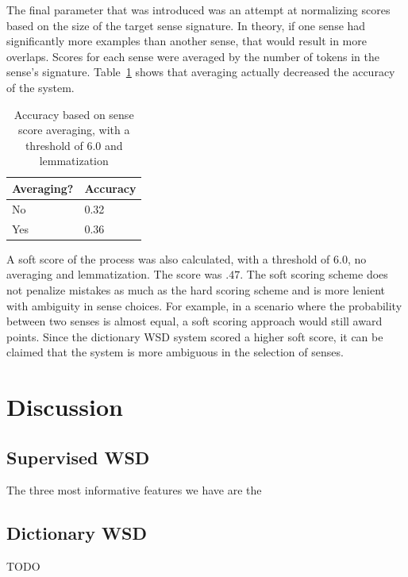 \documentclass[11pt]{article}
\begin{document}
The final parameter that was introduced was an attempt at normalizing scores based on the size of the target sense signature. In theory, if one sense had significantly more examples than another sense, that would result in more overlaps. Scores for each sense were averaged by the number of tokens in the sense's signature. Table~\ref{averaging} shows that averaging actually decreased the accuracy of the system.

\begin{table}[ht]
    \centering
    \begin{tabular}{|l|l|}
    \hline
    Averaging?                          & Accuracy   \\ \hline
    No & 0.32 \\
    Yes        & 0.36 \\ \hline
    \end{tabular}
\caption{Accuracy based on sense score averaging, with a threshold of 6.0 and lemmatization}
\label{averaging}
\end{table}

A soft score of the process was also calculated, with a threshold of 6.0, no averaging and lemmatization. The score was $.47$. The soft scoring scheme does not penalize mistakes as much as the hard scoring scheme and is more lenient with ambiguity in sense choices. For example, in a scenario where the probability between two senses is almost equal, a soft scoring approach would still award points. Since the dictionary WSD system scored a higher soft score, it can be claimed that the system is more ambiguous in the selection of senses.

\section{Discussion}
\subsection{Supervised WSD}
The three most informative features we have are the 

\subsection{Dictionary WSD}
TODO
\end{document}
